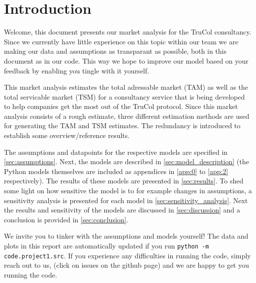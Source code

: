 \section{Introduction}\label{sec:intro}
Welcome, this document presents our market analysis for the TruCol consultancy. Since we currently have little experience on this topic within our team we are making our data and assumptions as transparant as possible, both in this document as in our code. This way we hope to improve our model based on your feedback by enabling you tingle with it yourself.

This market analysis estimates the total adressable market (TAM) as well as the total servicable market (TSM) for a consultancy service that is being developed to help companies get the most out of the TruCol protocol. Since this market analysis consists of a rough estimate, three different estimation methods are used for generating the TAM and TSM estimates. The redundancy is introduced to establish some overview/reference results.

The assumptions and datapoints for the respective models are specified in \cref{sec:assumptions}. Next, the models are described in \cref{sec:model_description} (the Python models themselves are included as appendices in \cref{app:0} to \cref{app:2} respectively). The results of these models are presented in \cref{sec:results}. To shed some light on how sensitive the model is to for example changes in assumptions, a sensitivity analysis is presented for each model in \cref{sec:sensitivity_analysis}. Next the results and sensitivity of the models are discussed in \cref{sec:discussion} and a conclusion is provided in \cref{sec:conclusion}.

We invite you to tinker with the assumptions and models yourself! The data and plots in this report are automatically updated if you run \verb+python -m code.project1.src+. If you experience any difficulties in running the code, simply reach out to us, (click on issues on the github page) and we are happy to get you running the code.
